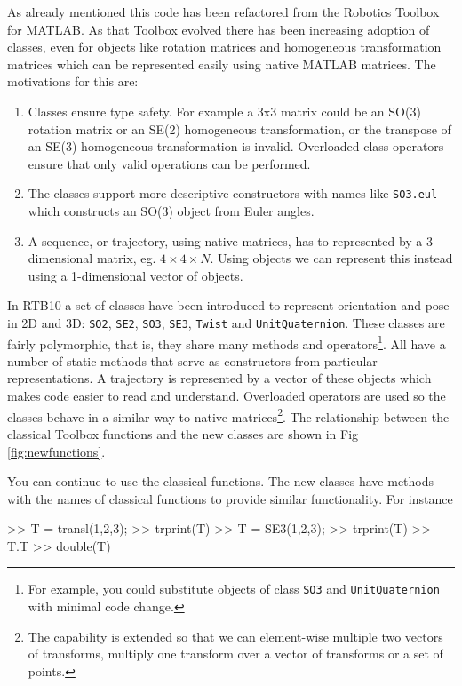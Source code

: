 \documentclass[a4paper,twoside]{report}
\begin{document}
As already mentioned this code has been refactored from the Robotics Toolbox for MATLAB.  As that Toolbox evolved there has been
increasing adoption of classes, even for objects like rotation matrices and homogeneous transformation matrices which can be
represented easily using native MATLAB matrices.  The motivations for this are:
\begin{enumerate}
\item Classes ensure type safety.  For example a 3x3 matrix could be an SO(3) rotation matrix or an SE(2) homogeneous transformation, or the transpose of an SE(3) homogeneous transformation is invalid.
Overloaded class operators ensure that only valid operations can be performed.
\item The classes support more descriptive constructors with names like \texttt{SO3.eul} which constructs an SO(3) object from Euler angles.
\item A sequence, or trajectory, using native matrices, has to represented by a 3-dimensional matrix, eg. $4\times 4 \times N$.  Using objects we can represent this instead using a 1-dimensional vector of objects.
\end{enumerate}
 
In RTB10 a set of classes have been introduced to represent orientation and pose in 2D and 3D: \texttt{SO2}, \texttt{SE2}, \texttt{SO3}, \texttt{SE3}, \texttt{Twist} and \texttt{UnitQuaternion}.  These classes are fairly polymorphic, that is, they share many methods and operators\footnote{For example, you could substitute objects of class \texttt{SO3} and \texttt{UnitQuaternion} with minimal code change.}.  All have a number of static methods that serve as constructors from particular representations.  A trajectory is represented by a vector of these objects which makes code easier to read and
understand.  Overloaded operators are used so the classes behave in a similar way to native matrices\footnote{The capability is extended so that we can element-wise multiple two vectors of transforms, multiply one transform over a vector of transforms or a set of points.}.
The relationship between the classical Toolbox functions and the new classes are shown in Fig \ref{fig:newfunctions}.

You can continue to use the classical functions.  The new classes have methods with the names of classical functions to provide similar functionality.  For instance
\begin{Code}
>> T = transl(1,2,3);  %
>> trprint(T)  %
>> T = SE3(1,2,3);  %
>> trprint(T)  %
>> T.T   %
>> double(T) %
\end{Code}
\end{document}
